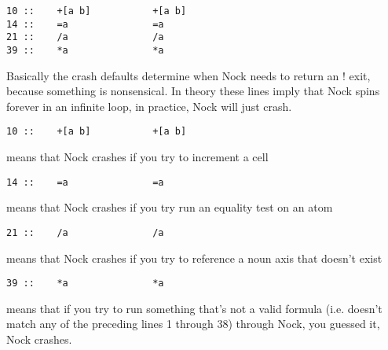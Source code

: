 \begin{framed_shaded}
\begin{Verbatim}[fontsize=\relsize{-2.5},commandchars=\\\{\}]
10 ::    +[a b]           +[a b]
14 ::    =a               =a
21 ::    /a               /a
39 ::    *a               *a
\end{Verbatim}
\end{framed_shaded}
Basically the crash defaults determine when Nock needs to return an ! exit, because something is nonsensical. In theory these lines imply that Nock spins forever in an infinite loop, in practice, Nock will just crash.

\begin{framed_shaded}
\begin{Verbatim}[fontsize=\relsize{-2.5},commandchars=\\\{\}]
10 ::    +[a b]           +[a b]
\end{Verbatim}
\end{framed_shaded}
means that Nock crashes if you try to increment a cell

\begin{framed_shaded}
\begin{Verbatim}[fontsize=\relsize{-2.5},commandchars=\\\{\}]
14 ::    =a               =a
\end{Verbatim}
\end{framed_shaded}
means that Nock crashes if you try run an equality test on an atom

\begin{framed_shaded}
\begin{Verbatim}[fontsize=\relsize{-2.5},commandchars=\\\{\}]
   21 ::    /a               /a
\end{Verbatim}
\end{framed_shaded}
means that Nock crashes if you try to reference a noun axis that doesn't exist

\begin{framed_shaded}
\begin{Verbatim}[fontsize=\relsize{-2.5},commandchars=\\\{\}]
39 ::    *a               *a
\end{Verbatim}
\end{framed_shaded}
means that if you try to run something that's not a valid formula (i.e. doesn't match any of the preceding lines 1 through 38) through Nock, you guessed it, Nock crashes.


